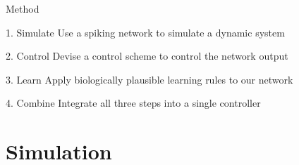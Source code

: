\documentclass[17pt, t, lualatex]{beamer}
\begin{document}
\begin{frame}{Method}
	\begin{block}{1. Simulate}
		Use a spiking network to simulate a dynamic system
	\end{block}

	\begin{block}{2. Control}
		Devise a control scheme to control the network output
	\end{block}
	\begin{block}{3. Learn}
		Apply biologically plausible learning rules to our network
	\end{block}

	\begin{block}{4. Combine}
		Integrate all three steps into a single controller
	\end{block}

\end{frame}


\section{Simulation}\insertsectionpage




\end{document}

